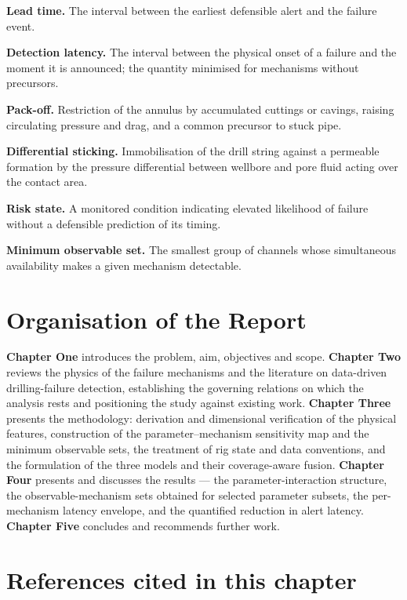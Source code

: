 \documentclass[12pt,a4paper]{report}
\begin{document}
\textbf{Lead time.} The interval between the earliest defensible alert and the failure event.

\textbf{Detection latency.} The interval between the physical onset of a failure and the moment it is announced;
the quantity minimised for mechanisms without precursors.

\textbf{Pack-off.} Restriction of the annulus by accumulated cuttings or cavings, raising circulating pressure
and drag, and a common precursor to stuck pipe.

\textbf{Differential sticking.} Immobilisation of the drill string against a permeable formation by the
pressure differential between wellbore and pore fluid acting over the contact area.

\textbf{Risk state.} A monitored condition indicating elevated likelihood of failure without a defensible
prediction of its timing.

\textbf{Minimum observable set.} The smallest group of channels whose simultaneous availability makes a given
mechanism detectable.

\section{Organisation of the Report}

\textbf{Chapter One} introduces the problem, aim, objectives and scope. \textbf{Chapter Two} reviews the physics of
the failure mechanisms and the literature on data-driven drilling-failure detection, establishing the
governing relations on which the analysis rests and positioning the study against existing work.
\textbf{Chapter Three} presents the methodology: derivation and dimensional verification of the physical
features, construction of the parameter--mechanism sensitivity map and the minimum observable sets, the
treatment of rig state and data conventions, and the formulation of the three models and their
coverage-aware fusion. \textbf{Chapter Four} presents and discusses the results --- the parameter-interaction
structure, the observable-mechanism sets obtained for selected parameter subsets, the per-mechanism latency
envelope, and the quantified reduction in alert latency. \textbf{Chapter Five} concludes and recommends further work.

\section*{References cited in this chapter}
\end{document}
